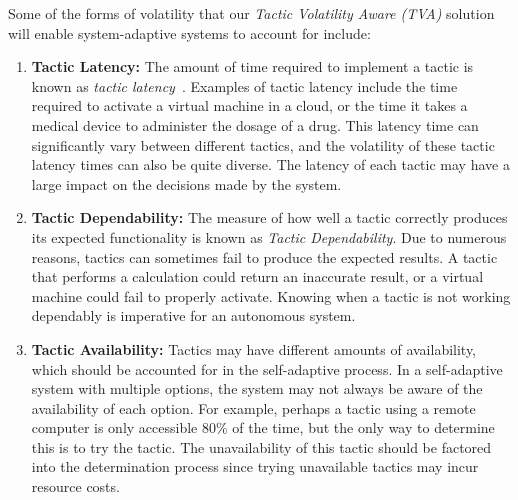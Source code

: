 \documentclass[12pt]{article}
\begin{document}


\vspace{2mm}
Some of the forms of volatility that our \emph{Tactic Volatility Aware (TVA)} solution will enable system-adaptive systems to account for include:

  \begin{enumerate}[noitemsep]
    \item \textbf{Tactic Latency: }The amount of time required to implement a tactic is known as \emph{tactic latency}~\cite{Moreno:2018:FED:3208359.3149180,moreno2017adaptation}. Examples of tactic latency include the time required to activate a virtual machine in a cloud, or the time it takes a medical device to administer the dosage of a drug. This latency time can significantly vary between different tactics, and the volatility of these tactic latency times can also be quite diverse. The latency of each tactic may have a large impact on the decisions made by the system.
    
    \item \textbf{Tactic Dependability: }The measure of how well a tactic correctly produces its expected functionality is known as \emph{Tactic Dependability}. Due to numerous reasons, tactics can sometimes fail to produce the expected results. A tactic that performs a calculation could return an inaccurate result, or a virtual machine could fail to properly activate. Knowing when a tactic is not working dependably is imperative for an autonomous system.
    
    \item \textbf{Tactic Availability: }  Tactics may have different amounts of availability, which should be accounted for in the self-adaptive process. In a self-adaptive system with multiple options, the system may not always be aware of the availability of each option. For example, perhaps a tactic using a remote computer is only accessible 80\% of the time, but the only way to determine this is to try the tactic. The unavailability of this tactic should be factored into the determination process since trying unavailable tactics may incur resource costs. %
    


  \end{enumerate}
\end{document}

